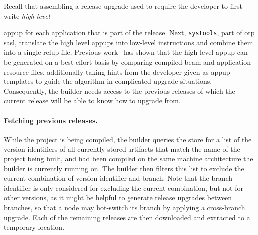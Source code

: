 Recall that assembling a release upgrade used to require the developer to first write \emph{high level} {\acrfull{appup} for each application that is part of the release. Next, \lstinline|systools|, part of \acrshort{otp} \acrfull{sasl}, translate the high level appups into low-level instructions and combine them into a single \acrfull{relup} file. Previous work~\cite{rebar3appup} has shown that the high-level \acrlong{appup} can be generated on a best-effort basis by comparing compiled \acrshort{beam} and application resource files, additionally taking hints from the developer given as appup templates to guide the algorithm in complicated upgrade situations. Consequently, the builder needs access to the previous releases of which the current release will be able to know how to upgrade from.

\paragraph{Fetching previous releases.} While the project is being compiled, the builder queries the store for a list of the version identifiers of all currently stored artifacts that match the name of the project being built, and had been compiled on the same machine architecture the builder is currently running on. The builder then filters this list to exclude the current combination of version identifier and branch. Note that the branch identifier is only considered for excluding the current combination, but not for other versions, as it might be helpful to generate release upgrades between branches, so that a node may hot-switch its branch by applying a cross-branch upgrade. Each of the remaining releases are then downloaded and extracted to a temporary location.

}
